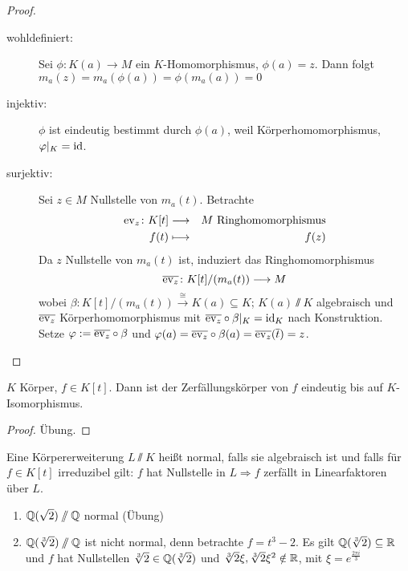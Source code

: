 \documentclass[12pt,a4paper]{scrartcl}
\begin{document}
\begin{proof}
	\leavevmode
	\begin{description}
		\item[wohldefiniert:] Sei $\phi\colon K(a)\to M$ ein $K$-Homomorphismus, $\phi(a) = z$. Dann folgt $m_a(z) = m_a(\phi(a)) = \phi(m_a(a)) = 0$
		\item[injektiv:] $\phi$ ist eindeutig bestimmt durch $\phi(a)$, weil Körperhomomorphismus, $\varphi|_K = \operatorname{id}$.
		\item[surjektiv:] Sei $z\in M$ Nullstelle von $m_a(t)$. Betrachte
		\begin{eqnarray*}
			\operatorname{ev}_z\colon K[t] & \longrightarrow & M \text{ Ringhomomorphismus}\\
			f(t) &\longmapsto & f(z)
		\end{eqnarray*}
		Da $z$ Nullstelle von $m_a(t)$ ist, induziert das Ringhomomorphismus
		$$\overline{\operatorname{ev}_z}\colon K[t]/(m_a(t))\longrightarrow M$$
		wobei $\beta\colon K[t]/(m_a(t)) \xrightarrow{\cong} K(a)\subseteq K$; $K(a)\sslash K$ algebraisch und $\overline{\operatorname{ev}_z}$ Körperhomomorphismus mit $\overline{\operatorname{ev}_z}\circ \beta|_K = \operatorname{id}_K$ nach Konstruktion. Setze $\varphi:= \overline{\operatorname{ev}_z}\circ\beta$ und $\varphi(a) = \overline{\operatorname{ev}_z}\circ\beta(a) = \overline{\operatorname{ev}_z}(\overline{t}) = z$.
  \qedhere
	\end{description}
\end{proof}
\begin{kor}
	$K$ Körper, $f\in K[t]$. Dann ist der Zerfällungskörper von $f$ eindeutig bis auf $K$-Isomorphismus.
\end{kor}
\begin{proof}
	Übung.
\end{proof}
\begin{defi} Eine Körpererweiterung $L\sslash K$ heißt normal, falls sie algebraisch ist und falls für $f\in K[t]$ irreduzibel gilt: $f$ hat Nullstelle in $L\Rightarrow f$ zerfällt in Linearfaktoren über $L$.
\end{defi}
\begin{bsp}
	\leavevmode
	\begin{enumerate}
		\item $\mathbb Q(\sqrt{2})\sslash \mathbb Q$ normal (Übung)
		\item $\mathbb Q(\sqrt[3]{2})\sslash \mathbb Q$ ist nicht normal, denn betrachte $f = t^3-2$. Es gilt $\mathbb Q(\sqrt[3]{2})\subseteq \mathbb R$ und $f$ hat Nullstellen $\sqrt[3]{2}\in \mathbb Q(\sqrt[3]{2})$ und $\sqrt[3]{2}\xi, \sqrt[3]{2}\xi^2\notin \mathbb R$, mit $\xi = e^{\frac{2\pi i}{3}}$
	\end{enumerate}
\end{bsp}
\end{document}
